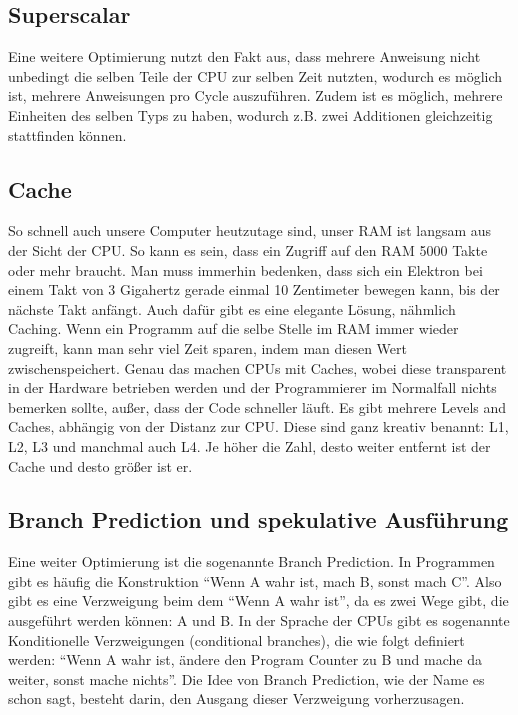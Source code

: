 \documentclass[8pt, letterpaper]{article}
\begin{document}
\subsection{Superscalar}\cite{wiki-superscalar}
Eine weitere Optimierung nutzt den Fakt aus, dass mehrere Anweisung nicht unbedingt die selben Teile der CPU zur selben Zeit nutzten, wodurch es möglich ist, mehrere Anweisungen pro Cycle auszuführen. Zudem ist es möglich, mehrere Einheiten des selben Typs zu haben, wodurch z.B. zwei Additionen gleichzeitig stattfinden können.

\subsection{Cache}\cite{wiki-cache}
So schnell auch unsere Computer heutzutage sind, unser RAM ist langsam aus der Sicht der CPU. So kann es sein, dass ein Zugriff auf den RAM 5000 Takte oder mehr braucht. Man muss immerhin bedenken, dass sich ein Elektron bei einem Takt von 3 Gigahertz gerade einmal 10 Zentimeter bewegen kann, bis der nächste Takt anfängt.
Auch dafür gibt es eine elegante Lösung, nähmlich Caching. Wenn ein Programm auf die selbe Stelle im RAM immer wieder zugreift, kann man sehr viel Zeit sparen, indem man diesen Wert zwischenspeichert. Genau das machen CPUs mit Caches, wobei diese transparent in der Hardware betrieben werden und der Programmierer im Normalfall nichts bemerken sollte, außer, dass der Code schneller läuft. Es gibt mehrere Levels and Caches, abhängig von der Distanz zur CPU. Diese sind ganz kreativ benannt: L1, L2, L3 und manchmal auch L4. Je höher die Zahl, desto weiter entfernt ist der Cache und desto größer ist er.

\subsection{Branch Prediction und spekulative Ausführung}\cite{wiki-branchpred}
Eine weiter Optimierung ist die sogenannte Branch Prediction. In Programmen gibt es häufig die Konstruktion ``Wenn A wahr ist, mach B, sonst mach C''. Also gibt es eine Verzweigung beim dem ``Wenn A wahr ist'', da es zwei Wege gibt, die ausgeführt werden können: A und B. In der Sprache der CPUs gibt es sogenannte Konditionelle Verzweigungen (conditional branches), die wie folgt definiert werden: ``Wenn A wahr ist, ändere den Program Counter zu B und mache da weiter, sonst mache nichts''. Die Idee von Branch Prediction, wie der Name es schon sagt, besteht darin, den Ausgang dieser Verzweigung vorherzusagen.
\end{document}
